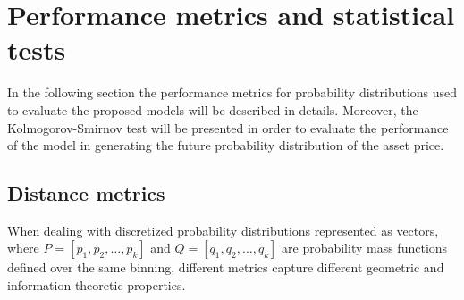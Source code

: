 \section{Performance metrics and statistical tests}
\label{sec:performance_metrics}
In the following section the performance metrics for probability distributions used to evaluate the proposed models will be described in details.
Moreover, the Kolmogorov-Smirnov test will be presented in order to evaluate the performance of the model in generating the future probability distribution of the asset price.\\
\subsection{Distance metrics}
When dealing with discretized probability distributions represented as vectors,
where $P = [p_1, p_2, \dots, p_k]$ and $Q = [q_1, q_2, \dots, q_k]$ are probability mass functions defined over the same binning, 
different metrics capture different geometric and information-theoretic properties.\\

